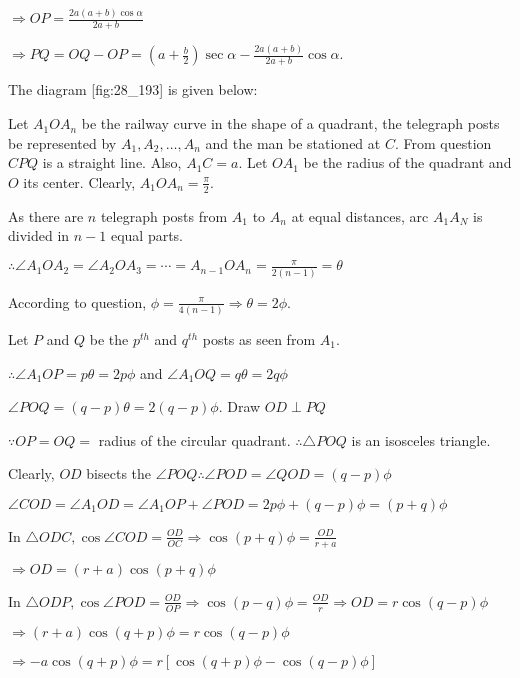   $\Rightarrow OP = \frac{2a(a + b)\cos\alpha}{2a + b}$

  $\Rightarrow PQ = OQ - OP = \left(a + \frac{b}{2}\right)\sec\alpha - \frac{2a(a + b)}{2a +
    b}\cos\alpha$.

\item The diagram [fig:28_193] is given below:

  \startplacefigure[reference=fig:28_193]
    \externalfigure[28_193.pdf]
  \stopplacefigure

  Let $A_1OA_n$ be the railway curve in the shape of a quadrant, the telegraph posts be
  represented by $A_1, A_2, \ldots, A_n$ and the man be stationed at $C$. From question
  $CPQ$  is a straight line. Also, $A_1C = a$. Let $OA_1$ be the radius of the quadrant
  and $O$ its center. Clearly, $A_1OA_n = \frac{\pi}{2}$.

  As there are $n$ telegraph posts from $A_1$ to $A_n$ at equal distances,
  arc $A_1A_N$ is divided in $n - 1$ equal parts.

  $\therefore \angle A_1OA_2 = \angle A_2OA_3 = \cdots = A_{n - 1}OA_n = \frac{\pi}{2(n - 1)} =
  \theta$

  According to question, $\phi = \frac{\pi}{4(n - 1)} \Rightarrow \theta = 2\phi$.

  Let $P$ and $Q$ be the $p^{th}$ and $q^{th}$ posts as seen from $A_1$.

  $\therefore \angle A_1OP = p\theta = 2p\phi$ and $\angle A_1OQ = q\theta = 2q\phi$

  $\angle POQ = (q - p)\theta = 2(q - p)\phi$. Draw $OD\perp PQ$

  $\because OP = OQ =$ radius of the circular quadrant. $\therefore \triangle POQ$ is an
  isosceles triangle.

  Clearly, $OD$ bisects the $\angle POQ \therefore \angle POD = \angle QOD = (q - p)\phi$

  $\angle COD = \angle A_1OD = \angle A_1OP + \angle POD = 2p\phi + (q - p)\phi = (p + q)\phi$

  In $\triangle ODC, \cos\angle COD = \frac{OD}{OC} \Rightarrow \cos(p + q)\phi = \frac{OD}{r + a}$

  $\Rightarrow OD = (r + a)\cos(p + q)\phi$

  In $\triangle ODP, \cos\angle POD = \frac{OD}{OP} \Rightarrow \cos(p - q)\phi =
  \frac{OD}{r}\Rightarrow OD = r\cos(q - p)\phi$

  $\Rightarrow (r + a)\cos(q + p)\phi = r\cos(q - p)\phi$

  $\Rightarrow -a\cos(q + p)\phi = r[\cos(q + p)\phi - \cos(q - p)\phi]$

